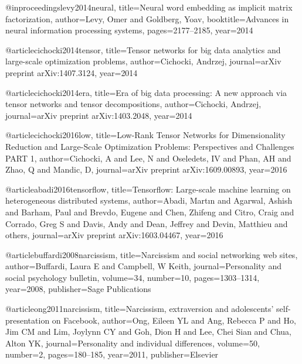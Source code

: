@inproceedings{levy2014neural,
  title={Neural word embedding as implicit matrix factorization},
  author={Levy, Omer and Goldberg, Yoav},
  booktitle={Advances in neural information processing systems},
  pages={2177--2185},
  year={2014}
}





@article{cichocki2014tensor,
  title={Tensor networks for big data analytics and large-scale optimization problems},
  author={Cichocki, Andrzej},
  journal={arXiv preprint arXiv:1407.3124},
  year={2014}
}

@article{cichocki2014era,
  title={Era of big data processing: A new approach via tensor networks and tensor decompositions},
  author={Cichocki, Andrzej},
  journal={arXiv preprint arXiv:1403.2048},
  year={2014}
}

@article{cichocki2016low,
  title={Low-Rank Tensor Networks for Dimensionality Reduction and Large-Scale Optimization Problems: Perspectives and Challenges PART 1},
  author={Cichocki, A and Lee, N and Oseledets, IV and Phan, AH and Zhao, Q and Mandic, D},
  journal={arXiv preprint arXiv:1609.00893},
  year={2016}
}

@article{abadi2016tensorflow,
  title={Tensorflow: Large-scale machine learning on heterogeneous distributed systems},
  author={Abadi, Mart{\i}n and Agarwal, Ashish and Barham, Paul and Brevdo, Eugene and Chen, Zhifeng and Citro, Craig and Corrado, Greg S and Davis, Andy and Dean, Jeffrey and Devin, Matthieu and others},
  journal={arXiv preprint arXiv:1603.04467},
  year={2016}
}



@article{buffardi2008narcissism,
  title={Narcissism and social networking web sites},
  author={Buffardi, Laura E and Campbell, W Keith},
  journal={Personality and social psychology bulletin},
  volume={34},
  number={10},
  pages={1303--1314},
  year={2008},
  publisher={Sage Publications}
}

@article{ong2011narcissism,
  title={Narcissism, extraversion and adolescents’ self-presentation on Facebook},
  author={Ong, Eileen YL and Ang, Rebecca P and Ho, Jim CM and Lim, Joylynn CY and Goh, Dion H and Lee, Chei Sian and Chua, Alton YK},
  journal={Personality and individual differences},
  volume={50},
  number={2},
  pages={180--185},
  year={2011},
  publisher={Elsevier}
}

